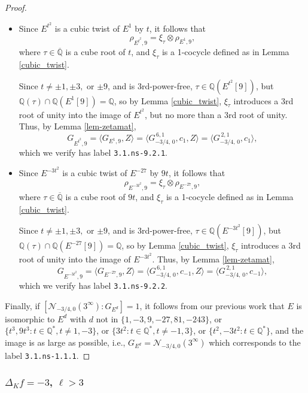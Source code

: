 \documentclass[11pt]{amsart}
\theoremstyle{definition}
\newcommand{\Q}{\mathbb Q}
\begin{document}
\begin{proof}
 \begin{itemize}
     \item Since $E^{t^2}$ is a cubic twist of $E^1$ by $t$, it follows that 
     \[ \rho_{E^{t^2}, 9} = \xi_{\tau} \otimes \rho_{E^1, 9},\] 
     where $\tau \in \overline{\Q}$ is a cube root of $t$, and $\xi_\tau$ is a 1-cocycle defined as in Lemma \ref{cubic_twist}.
     
     Since $t \neq \pm 1, \pm 3,$ or $\pm 9$, and is 3rd-power-free, $\tau \in \Q(E^{t^2}[9])$, but $\Q(\tau) \cap \Q(E^1[9]) = \Q$, so by Lemma \ref{cubic_twist}, $\xi_\tau$ introduces a 3rd root of unity into the image of $E^{t^2}$, but no more than a 3rd root of unity. Thus, by Lemma \ref{lem-zetamat}, \[ G_{E^{t^2}, 9} = \langle G_{E^1, 9}, Z \rangle = \langle G^{\, 6,1}_{-3/4, \, 0}, c_1, Z \rangle = \langle G^{\, 2,1}_{-3/4, \, 0}, c_1 \rangle,\]
     which we verify has label \texttt{3.1.ns-9.2.1}.
     
     \item Since $E^{-3t^2}$ is a cubic twist of $E^{-27}$ by $9t$, it follows that 
     \[ \rho_{E^{-3t^2}, 9} = \xi_{\tau} \otimes \rho_{E^{-27}, 9},\] 
     where $\tau \in \overline{\Q}$ is a cube root of $9t$, and $\xi_\tau$ is a 1-cocycle defined as in Lemma \ref{cubic_twist}.
     
     Since $t \neq \pm 1, \pm 3,$ or $\pm 9$, and is 3rd-power-free, $\tau \in \Q(E^{-3t^2}[9])$, but $\Q(\tau) \cap \Q(E^{-27}[9]) = \Q$, so by Lemma \ref{cubic_twist}, $\xi_\tau$ introduces a 3rd root of unity into the image of $E^{-3t^2}$. Thus, by Lemma \ref{lem-zetamat}, \[ G_{E^{-3t^2}, 9} = \langle G_{E^{-27}, 9}, Z \rangle = \langle G^{\, 6,1}_{-3/4, \, 0}, c_{-1}, Z \rangle = \langle G^{\, 2,1}_{-3/4, \, 0}, c_{-1} \rangle,\]
     which we verify has label \texttt{3.1.ns-9.2.2}.
 \end{itemize}

 Finally, if $[\mathcal{N}_{-3/4,0}(3^{\infty}): G_{E^d}]=1$, it follows from our previous work that $E$ is isomorphic to $E^d$ with $d$ not in $\{1, -3, 9, -27, 81, -243 \}$, or $\{ t^3, 9t^3 : t \in \Q^{\ast}, t \neq 1, -3 \}$, or $\{ 3t^2 : t \in \Q^{\ast}, t \neq -1, 3\}$, or $\{t^2, -3t^2 : t \in \Q^{\ast}\}$, and the image is as large as possible, i.e., $G_{E^d}=\mathcal{N}_{-3/4,0}(3^{\infty})$ which corresponds to the label \texttt{3.1.ns-1.1.1}.
    \end{proof}



\subsubsection{$\Delta_Kf=-3$, $\ell > 3$}\label{sec-delta3ellmorethan3}
\end{document}

